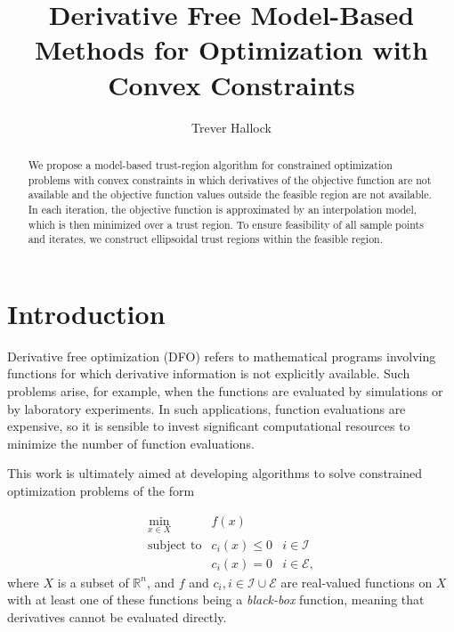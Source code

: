 \documentclass{article}
\title{Derivative Free Model-Based Methods for Optimization with Convex Constraints}
\author{Trever Hallock}
\theoremstyle{case}
\newcommand{\domain}{X}
\newcommand{\real}{\mathbb R}
\begin{document}
\maketitle

\begin{abstract}

We propose a model-based trust-region algorithm for constrained optimization problems with convex constraints in which derivatives of the objective function are not available and the objective function values outside the feasible region are not available.
In each iteration, the objective function is approximated by an interpolation model, which is then minimized over a trust region.
To ensure feasibility of all sample points and iterates, we construct ellipsoidal trust regions within the feasible region.

\end{abstract}

\newpage

\tableofcontents

\newpage


\section{Introduction}

Derivative free optimization (DFO) refers to mathematical programs involving functions for which derivative information is not explicitly available.
Such problems arise, for example, when the functions are evaluated by simulations or by laboratory experiments.
In such applications, function evaluations are expensive, so it is sensible to invest significant computational resources to minimize the number of function evaluations.

This work is ultimately aimed at developing algorithms to solve constrained optimization problems of the form 

\[ \begin{array}{ccl} \min_{x \in \domain} & f(x) \\
\mbox{subject to} & c_i(x) \le 0 & i \in \mathcal{I} \\
& c_i(x) = 0 & i \in \mathcal{E},
\end{array}
\]
where $\domain$ is a subset of $\real^n$, and $f$ and $c_i, i \in \mathcal{I} \cup \mathcal{E}$ are real-valued functions on $X$ with at least one of these functions being a {\em black-box} function, meaning that derivatives cannot be evaluated directly.

\end{document}
